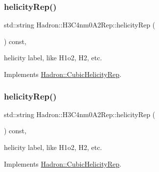 \mbox{\label{structHadron_1_1H3C4nm0A2Rep_a14eb635569428c91f83b7019b68ab2b6}} 
\subsubsection{\texorpdfstring{helicityRep()}{helicityRep()}\hspace{0.1cm}{\footnotesize\ttfamily [1/2]}}
{\footnotesize\ttfamily std\+::string Hadron\+::\+H3\+C4nm0\+A2\+Rep\+::helicity\+Rep (\begin{DoxyParamCaption}{ }\end{DoxyParamCaption}) const\hspace{0.3cm}{\ttfamily [inline]}, {\ttfamily [virtual]}}

helicity label, like H1o2, H2, etc. 

Implements \mbox{\hyperlink{structHadron_1_1CubicHelicityRep_af1096946b7470edf0a55451cc662f231}{Hadron\+::\+Cubic\+Helicity\+Rep}}.

\mbox{\label{structHadron_1_1H3C4nm0A2Rep_a14eb635569428c91f83b7019b68ab2b6}} 
\subsubsection{\texorpdfstring{helicityRep()}{helicityRep()}\hspace{0.1cm}{\footnotesize\ttfamily [2/2]}}
{\footnotesize\ttfamily std\+::string Hadron\+::\+H3\+C4nm0\+A2\+Rep\+::helicity\+Rep (\begin{DoxyParamCaption}{ }\end{DoxyParamCaption}) const\hspace{0.3cm}{\ttfamily [inline]}, {\ttfamily [virtual]}}

helicity label, like H1o2, H2, etc. 

Implements \mbox{\hyperlink{structHadron_1_1CubicHelicityRep_af1096946b7470edf0a55451cc662f231}{Hadron\+::\+Cubic\+Helicity\+Rep}}.

\mbox{\label{structHadron_1_1H3C4nm0A2Rep_ab4e5ed700d7f03a7c2b8368304277671}} 
